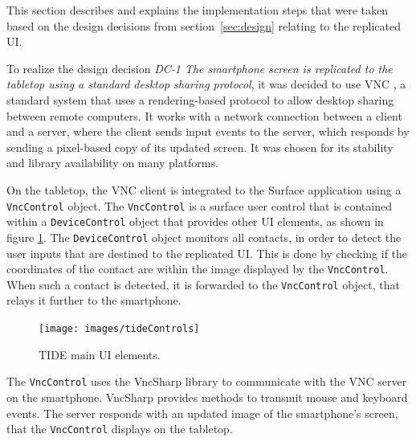 
This section describes and explains the implementation steps that were taken based on the design decisions from section~\ref{sec:design} relating to the replicated UI.

To realize the design decision
\emph{DC-1 The smartphone screen is replicated to the tabletop using a standard desktop sharing protocol}, 
it was decided to use VNC \citep{Richardson:1998:vnc}, a standard system that uses a rendering-based protocol to allow desktop sharing between remote computers.
It works with a network connection between a client and a server, where the client sends input events to the server, which responds by sending a pixel-based copy of its updated screen.
It was chosen for its stability and library availability on many platforms.


On the tabletop, the VNC client is integrated to the Surface application using a \texttt{VncControl} object.
The \texttt{VncControl} is a surface user control that is contained within a \texttt{DeviceControl} object that provides other UI elements, as shown in figure \ref{fig:tideControls}.
The \texttt{DeviceControl} object monitors all contacts, in order to detect the user inputs that are destined to the replicated UI.
This is done by checking if the coordinates of the contact are within the image displayed by the \texttt{VncControl}.
When such a contact is detected, it is forwarded to the \texttt{VncControl} object, that relays it further to the smartphone.

\begin{figure}[htb]
  \centering
    \texttt{[image: images/tideControls]}
    \caption{TIDE main UI elements.}
    \label{fig:tideControls}
\end{figure}

The \texttt{VncControl} uses the VncSharp library to communicate with the VNC server on the smartphone.
VncSharp provides methods to transmit mouse and keyboard events.
The server responds with an updated image of the smartphone's screen, that the \texttt{VncControl} displays on the tabletop.

